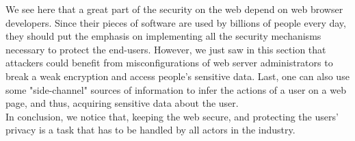 \documentclass[journal]{IEEEtran}
\begin{document}
We see here that a great part of the security on the web depend on web browser developers. Since their pieces of software are used by billions of people every day, they should put the emphasis on implementing all the security mechanisms necessary to protect the end-users. However, we just saw in this section that attackers could benefit from misconfigurations of web server administrators to break a weak encryption and access people's sensitive data. Last, one can also use some "side-channel" sources of information to infer the actions of a user on a web page, and thus, acquiring sensitive data about the user. \\ 
In conclusion, we notice that, keeping the web secure, and protecting the users' privacy is a task that has to be handled by all actors in the industry.




%

\end{document}

